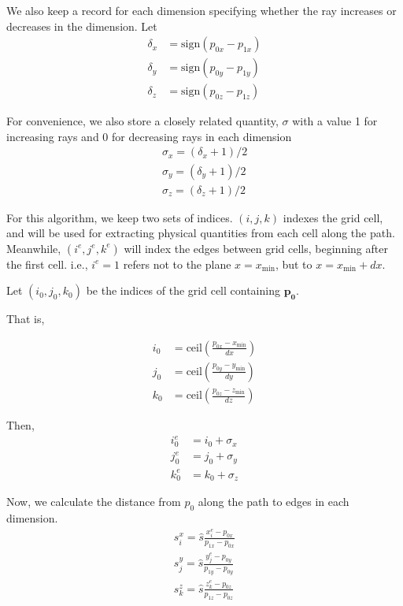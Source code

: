 \documentclass[ms,cpyr,lof,lot]{uathesis}
\newcommand\xmin{{x_{\min}}}
\newcommand\ymin{{y_{\min}}}
\newcommand\zmin{{z_{\min}}}
\newcommand{\sign}{\mbox{sign}}
\newcommand{\ceil}{\mbox{ceil}}
\renewcommand\vec\bm
\begin{document}
We also keep a record for each dimension specifying whether the ray increases
or decreases in the dimension. Let
\begin{align}
  \delta_x &= \sign(p_{0x}-p_{1x}) \\
  \delta_y &= \sign(p_{0y}-p_{1y}) \\
  \delta_z &= \sign(p_{0z}-p_{1z})
\end{align}

For convenience, we also store a closely related quantity, $\sigma$ with a value 1 for
increasing rays and 0 for decreasing rays in each dimension
\begin{align}
  \sigma_x = (\delta_x+1)/2 \\
  \sigma_y = (\delta_y+1)/2 \\
  \sigma_z = (\delta_z+1)/2
\end{align}

For this algorithm, we keep two sets of indices. $(i,j,k)$ indexes the grid
cell, and will be used for extracting physical quantities from each cell along
the path.
Meanwhile, $(i^e,j^e,k^e)$ will index the edges between grid cells, beginning
after the first cell. i.e., $i^e=1$ refers not to the plane $x=\xmin$, but to $x=\xmin+dx$.

Let $(i_0, j_0, k_0)$ be the indices of the grid cell containing $\vec{p_0}$.

That is,

\begin{align}
  i_0 &= \ceil\left(\frac{p_{0x}-\xmin}{dx}\right) \\
  j_0 &= \ceil\left(\frac{p_{0y}-\ymin}{dy}\right) \\
  k_0 &= \ceil\left(\frac{p_{0z}-\zmin}{dz}\right)
\end{align}

Then,
\begin{align}
  i_0^e &= i_0 + \sigma_x \\
  j_0^e &= j_0 + \sigma_y \\
  k_0^e &= k_0 + \sigma_z
\end{align}

Now, we calculate the distance from $p_0$ along the path to edges in each dimension.
\begin{align}
  s_i^x = \hat{s}\frac{x_i^e-p_{0x}}{p_{1x}-p_{0x}} \\
  s_j^y = \hat{s}\frac{y_j^e-p_{0y}}{p_{1y}-p_{0y}} \\
  s_k^z = \hat{s}\frac{z_k^e-p_{0z}}{p_{1z}-p_{0z}}
\end{align}
\end{document}
